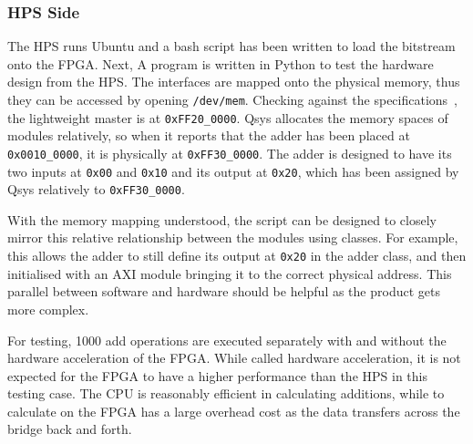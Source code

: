 \subsubsection{\textbf{HPS Side}}
The HPS runs Ubuntu and a bash script has been written to load the bitstream
onto the FPGA.
Next, A program is written in Python to test the hardware design from the HPS.
The interfaces are mapped onto the physical memory, thus they can be accessed
by opening \texttt{/dev/mem}.
Checking against the specifications~\cite{Altera6}, the lightweight master is
at \texttt{0xFF20\_0000}.
Qsys allocates the memory spaces of modules relatively, so when it reports
that the adder has been placed at \texttt{0x0010\_0000}, it is physically at
\texttt{0xFF30\_0000}.
The adder is designed to have its two inputs at \texttt{0x00} and
\texttt{0x10} and its output at \texttt{0x20}, which has been assigned by Qsys
relatively to \texttt{0xFF30\_0000}.

With the memory mapping understood, the script can be designed to closely
mirror this relative relationship between the modules using classes.
For example, this allows the adder to still define its output at \texttt{0x20}
in the adder class, and then initialised with an AXI module bringing it to the
correct physical address.
This parallel between software and hardware should be helpful as the product
gets more complex.


For testing, 1000 add operations are executed separately with and without the
hardware acceleration of the FPGA.
While called hardware acceleration, it is not expected for the FPGA to have
a higher performance than the HPS in this testing case.
The CPU is reasonably efficient in calculating additions, while to calculate
on the FPGA has a large overhead cost as the data transfers across the bridge
back and forth.

